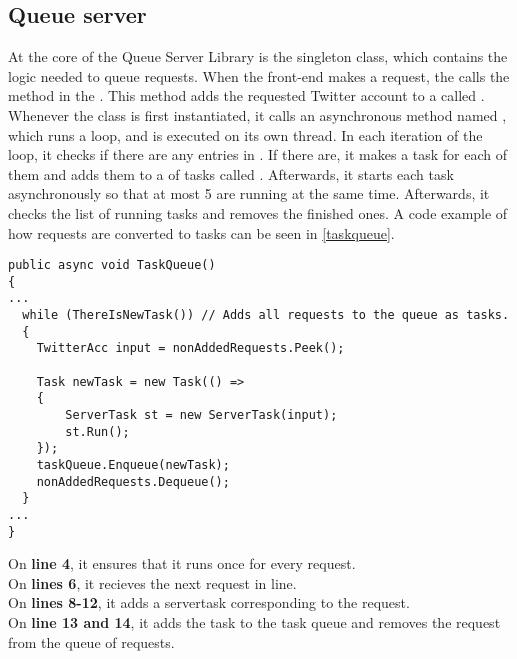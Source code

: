 \subsection{Queue server} \label{sub:queueserver}
At the core of the Queue Server Library is the 
singleton class, which contains the logic needed to queue requests. When the
front-end makes a request, the  calls the
 method in the . This method adds the
requested Twitter account to a  called .
Whenever the  class is first instantiated, it calls
an asynchronous method named , which runs a 
loop, and is executed on its own thread. In each iteration of the loop, it
checks if there are any entries in . If there are, it
makes a task for each of them and adds them to a  of tasks called
. Afterwards, it starts each task asynchronously so that at
most 5 are running at the same time.
Afterwards, it checks the list of running tasks and removes the finished ones. A
code example of how requests are converted to tasks can be seen in
\autoref{taskqueue}. \\

\begin{minipage}[H]{\linewidth}
\begin{lstlisting}[caption = Adding tasks to the queue, label = taskqueue] 
public async void TaskQueue()
{
...
  while (ThereIsNewTask()) // Adds all requests to the queue as tasks.
  {
	TwitterAcc input = nonAddedRequests.Peek();
	
	Task newTask = new Task(() =>
	{
	    ServerTask st = new ServerTask(input);
	    st.Run();
	});
	taskQueue.Enqueue(newTask);
	nonAddedRequests.Dequeue();
  }
...  
}

\end{lstlisting}
\end{minipage}

On \textbf{line 4}, it ensures that it runs once for every request. \\
On \textbf{lines 6}, it recieves the next request in line.\\
On \textbf{lines 8-12}, it adds a servertask corresponding to the request.\\
On \textbf{line 13 and 14}, it adds the task to the task queue and removes the
request from the queue of requests.\\

